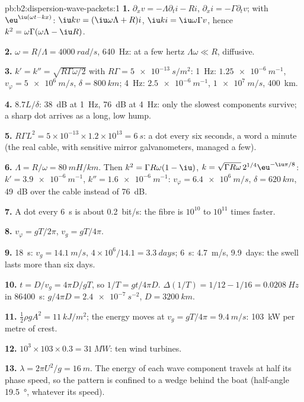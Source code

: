 \begin{solution}{pb:b2:dispersion-wave-packets:1}
\textbf{1.} $\partial_xv = -\Lambda\partial_ti - Ri$, $\partial_xi = -\Gamma\partial_tv$; with
$\eu^{\iu(\omega t - kx)}$: $\iu kv = (\iu\omega\Lambda + R)i$, $\iu ki = \iu\omega\Gamma v$, hence
$k^2 = \omega\Gamma(\omega\Lambda - \iu R)$.

\textbf{2.} $\omega = R/\Lambda = \qty{4000}{rad/s}$, \qty{640}{Hz}: at a few hertz $\Lambda\omega
\ll R$, diffusive.

\textbf{3.} $k' = k'' = \sqrt{R\Gamma\omega/2}$ with $R\Gamma = \qty{5e-13}{s/m^2}$: \qty{1}{Hz}:
$\qty{1.25e-6}{m^{-1}}$, $v_\varphi = \qty{5e6}{m/s}$, $\delta = \qty{800}{km}$; \qty{4}{Hz}:
$\qty{2.5e-6}{m^{-1}}$, $\qty{1e7}{m/s}$, \qty{400}{km}.

\textbf{4.} $8.7L/\delta$: \qty{38}{dB} at \qty{1}{Hz}, \qty{76}{dB} at \qty{4}{Hz}: only the
slowest components survive; a sharp dot arrives as a long, low hump.

\textbf{5.} $R\Gamma L^2 = 5 \times 10^{-13} \times 1.2 \times 10^{13} = \qty{6}{s}$: a dot every
six seconds, a word a minute (the real cable, with sensitive mirror
galvanometers, managed a few).

\textbf{6.} $\Lambda = R/\omega = \qty{80}{mH/km}$. Then $k^2 = \Gamma R\omega(1 - \iu)$, $k = \sqrt{\Gamma R\omega}
\,2^{1/4}\eu^{-\iu\pi/8}$: $k' = \qty{3.9e-6}{m^{-1}}$, $k'' = \qty{1.6e-6}{m^{-1}}$: $v_\varphi =
\qty{6.4e6}{m/s}$, $\delta = \qty{620}{km}$, \qty{49}{dB} over the cable instead of
\qty{76}{dB}.

\textbf{7.} A dot every \qty{6}{s} is about \qty{0.2}{bit/s}: the fibre is
$10^{10}$ to $10^{11}$ times faster.

\textbf{8.} $v_\varphi = gT/2\pi$, $v_g = gT/4\pi$.

\textbf{9.} \qty{18}{s}: $v_g = \qty{14.1}{m/s}$, $4 \times 10^6/14.1 = \qty{3.3}{days}$;
\qty{6}{s}: \qty{4.7}{m/s}, \qty{9.9}{days}: the swell lasts more than six days.

\textbf{10.} $t = D/v_g = 4\pi D/gT$, so $1/T = gt/4\pi D$. $\Delta(1/T) = 1/12 - 1/16
= \qty{0.0208}{Hz}$ in \qty{86400}{s}: $g/4\pi D = \qty{2.4e-7}{s^{-2}}$, $D = \qty{3200}{km}$.

\textbf{11.} $\tfrac12\rho gA^2 = \qty{11}{kJ/m^2}$; the energy moves at $v_g = gT/4\pi =
\qty{9.4}{m/s}$: \qty{103}{kW} per metre of crest.

\textbf{12.} $10^3 \times 103 \times 0.3 = \qty{31}{MW}$: ten wind turbines.

\textbf{13.} $\lambda = 2\pi U^2/g = \qty{16}{m}$. The energy of each wave component
travels at half its phase speed, so the pattern is confined to a wedge
behind the boat (half-angle \qty{19.5}{\degree}, whatever its speed).


\end{solution}
